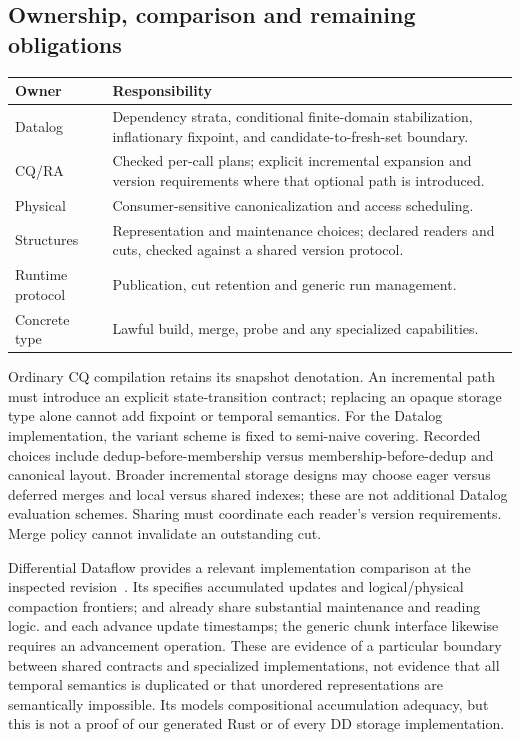 \subsection{Ownership, comparison and remaining obligations}
\begin{center}
\begin{tabular}{p{.22\linewidth}p{.68\linewidth}}
\toprule
Owner & Responsibility\\
\midrule
Datalog & Dependency strata, conditional finite-domain stabilization,
inflationary fixpoint, and candidate-to-fresh-set boundary.\\
CQ/RA & Checked per-call plans; explicit incremental expansion and version
requirements where that optional path is introduced.\\
Physical & Consumer-sensitive canonicalization and access scheduling.\\
Structures & Representation and maintenance choices; declared readers and
cuts, checked against a shared version protocol.\\
Runtime protocol & Publication, cut retention and generic run management.\\
Concrete type & Lawful build, merge, probe and any specialized capabilities.\\
\bottomrule
\end{tabular}
\end{center}
Ordinary CQ compilation retains its snapshot denotation. An incremental
path must introduce an explicit state-transition contract; replacing an
opaque storage type alone cannot add fixpoint or temporal semantics.
For the Datalog implementation, the variant scheme is fixed to semi-naive
covering. Recorded choices include dedup-before-membership versus
membership-before-dedup and canonical layout. Broader incremental storage
designs may choose eager versus deferred merges and local versus shared indexes;
these are not additional Datalog evaluation schemes. Sharing must coordinate
each reader's version requirements. Merge policy cannot invalidate an outstanding cut.

Differential Dataflow provides a relevant implementation comparison at the
inspected revision~\cite{code-dd}. Its  specifies accumulated
updates and logical/physical compaction frontiers;  and
 already share substantial maintenance and reading logic.
 and  each advance update timestamps;
the generic chunk interface likewise requires an advancement operation.
These are evidence of a particular boundary between shared contracts and
specialized implementations, not evidence that all temporal semantics is
duplicated or that unordered representations are semantically impossible.
Its  models compositional
accumulation adequacy, but this is not a proof of our generated Rust or of
every DD storage implementation.

